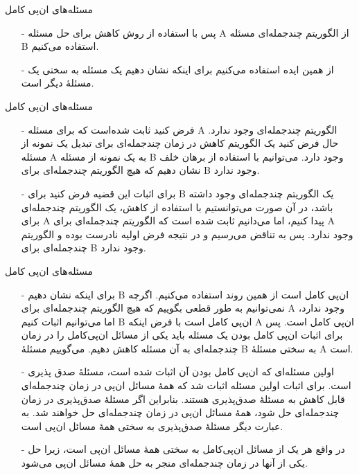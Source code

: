 \begin{frame}{مسئله‌های ان‌پی کامل}
\begin{itemize}\itemr
\item[-]
پس با استفاده از روش کاهش برای حل مسئله A از الگوریتم چندجمله‌ای مسئله B استفاده می‌کنیم.
\item[-]
از همین ایده استفاده می‌کنیم برای اینکه نشان دهیم یک مسئله به سختی یک مسئلهٔ دیگر است.
\end{itemize}
\end{frame}


\begin{frame}{مسئله‌های ان‌پی کامل}
\begin{itemize}\itemr
\item[-]
فرض کنید ثابت شده‌است که برای مسئله A الگوریتم چندجمله‌ای وجود ندارد. حال فرض کنید یک الگوریتم کاهش در زمان چندجمله‌ای برای تبدیل یک نمونه از مسئله A به یک نمونه از مسئله B وجود دارد. می‌توانیم با استفاده از برهان خلف نشان دهیم که هیچ الگوریتم چندجمله‌ای برای B وجود ندارد.
\item[-]
برای اثبات این قضیه فرض کنید برای B یک الگوریتم چندجمله‌ای وجود داشته باشد، در آن صورت می‌توانستیم با استفاده از کاهش، یک الگوریتم چندجمله‌ای برای A پیدا کنیم، اما می‌دانیم ثابت شده است که الگوریتم چندجمله‌ای برای A وجود ندارد. پس به تناقض می‌رسیم و در نتیجه فرض اولیه نادرست بوده و الگوریتم چندجمله‌ای برای ‌B وجود ندارد.
\end{itemize}
\end{frame}

\begin{frame}{مسئله‌های ان‌پی کامل}
\begin{itemize}\itemr
\item[-]
برای اینکه نشان دهیم B ان‌پی کامل است از همین روند استفاده می‌کنیم. اگرچه نمی‌توانیم به طور قطعی بگوییم که هیچ الگوریتم چندجمله‌ای برای A وجود ندارد، اما می‌توانیم اثبات کنیم B ان‌پی کامل است با فرض اینکه A ان‌پی کامل است.
پس برای اثبات ان‌پی کامل بودن یک مسئله باید یکی از مسائل ان‌پی‌کامل را در زمان چندجمله‌ای به آن مسئله کاهش دهیم.
می‌گوییم مسئلهٔ B به سختی مسئلهٔ A است.
\item[-]
اولین مسئله‌ای که ان‌پی کامل بودن آن اثبات شده است، مسئلهٔ صدق پذیری است.
برای اثبات اولین مسئله اثبات شد که همهٔ مسائل ان‌پی در زمان چندجمله‌ای قابل کاهش به مسئلهٔ صدق‌پذیری هستند. بنابراین اگر مسئلهٔ صدق‌پذیری در زمان چندجمله‌ای حل شود، همهٔ مسائل ان‌پی در زمان چندجمله‌ای حل خواهند شد. به عبارت دیگر مسئلهٔ صدق‌پذیری به سختی همهٔ مسائل ان‌پی است.
\item[-]
در واقع هر یک از مسائل ان‌پی‌کامل به سختی همهٔ مسائل ان‌پی است، زیرا حل یکی از آنها در زمان چندجمله‌ای منجر به حل همهٔ مسائل ان‌پی می‌شود.
\end{itemize}
\end{frame}